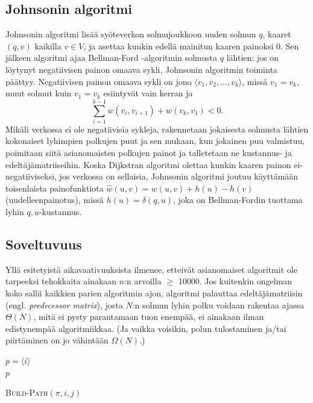 \documentclass[finnish]{tktltiki2}
\newenvironment{finalgo}[1][htb]{
  \renewcommand{\algorithmcfname}{Algoritmi}
  \begin{algorithm}[#1]
}{\end{algorithm}}
\theoremstyle{definition}
\theoremstyle{remark}
\begin{document}
\subsection{Johnsonin algoritmi}
Johnsonin algoritmi lisää syöteverkon solmujoukkoon uuden solmun $q$, kaaret $(q, v)$ kaikilla $v \in V$, ja asettaa kunkin edellä mainitun kaaren painoksi 0. Sen jälkeen algoritmi ajaa Bellman-Ford -algoritmin solmusta $q$ lähtien: jos on löytynyt negatiivisen painon omaava sykli, Johnsonin algoritmin toiminta päättyy. 
Negatiivisen painon omaava sykli on jono $\langle v_1, v_2, \dots, v_k \rangle$, missä $v_1 = v_k$, muut solmut kuin $v_1 = v_k$ esiintyvät vain kerran ja 
\[
\sum_{i = 1}^{k - 1} w(v_i, v_{i +1}) + w(v_k, v_1) < 0.
\]
Mikäli verkossa ei ole negatiivisia sykleja, rakennetaan jokaisesta solmusta lähtien kokonaiset lyhimpien polkujen puut ja sen mukaan, kun jokainen puu valmistuu, poimitaan siitä asianomaisten polkujen painot ja talletetaan ne kustannus- ja edeltäjämatriiseihin. Koska Dijkstran algoritmi olettaa kunkin kaaren painon ei-negatiiviseksi, jos verkossa on sellaisia, Johnsonin algoritmi joutuu käyttämään toisenlaista painofunktiota $\hat{w}(u, v) = w(u, v) + h(u) - h(v)$ (uudelleenpainotus), missä $h(u) = \delta(q, u)$, joka on Bellman-Fordin tuottama lyhin $q, u$-kustannus.

\subsection{Soveltuvuus}
Yllä esitetyistä aikavaativuuksista ilmenee, etteivät asianomaiset algoritmit ole tarpeeksi tehokkaita ainakaan $n$:n arvoilla $\geq$ 10000. Jos kuitenkin ongelman koko sallii kaikkien parien algoritmin ajon, algoritmi palauttaa edeltäjämatriisin (engl. \textit{predecessor matrix}), josta $N$:n solmun lyhin polku voidaan rakentaa ajassa $\Theta(N)$, mitä ei pysty parantamaan tuon enempää, ei ainakaan ilman edistynempää algoritmiikkaa. (Ja vaikka voisikin, polun tulostaminen ja/tai piirtäminen on jo vähintään $\Omega(N)$.)
\begin{finalgo}[t]
$p = \langle i \rangle$ \\
\KwRet $p$ \\
\label{alg:buildpath}
\caption{\textsc{Build-Path}$(\pi, i, j)$}
\end{finalgo}
\end{document}
